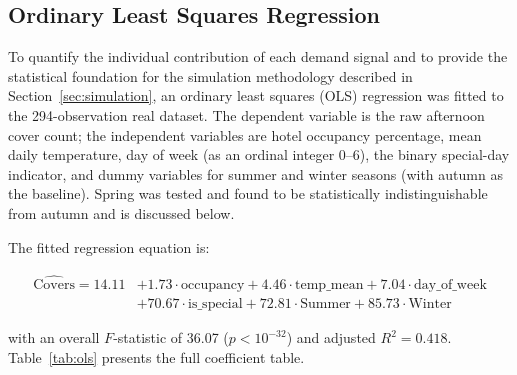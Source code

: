 \documentclass[12pt,a4paper,oneside]{article}
\begin{document}
\subsection{Ordinary Least Squares Regression}
\label{sec:ols}

To quantify the individual contribution of each demand signal and to provide the statistical foundation for the simulation methodology described in Section~\ref{sec:simulation}, an ordinary least squares (OLS) regression was fitted to the 294-observation real dataset. The dependent variable is the raw afternoon cover count; the independent variables are hotel occupancy percentage, mean daily temperature, day of week (as an ordinal integer 0--6), the binary special-day indicator, and dummy variables for summer and winter seasons (with autumn as the baseline). Spring was tested and found to be statistically indistinguishable from autumn and is discussed below.

The fitted regression equation is:

\begin{equation}
\begin{split}
\widehat{\text{Covers}} = 14.11 &+ 1.73 \cdot \text{occupancy} + 4.46 \cdot \text{temp\_mean} + 7.04 \cdot \text{day\_of\_week} \\
                                &+ 70.67 \cdot \text{is\_special} + 72.81 \cdot \text{Summer} + 85.73 \cdot \text{Winter}
\end{split}
\label{eq:ols}
\end{equation}

\noindent with an overall $F$-statistic of 36.07 ($p < 10^{-32}$) and adjusted $R^2 = 0.418$. Table~\ref{tab:ols} presents the full coefficient table.
\end{document}
